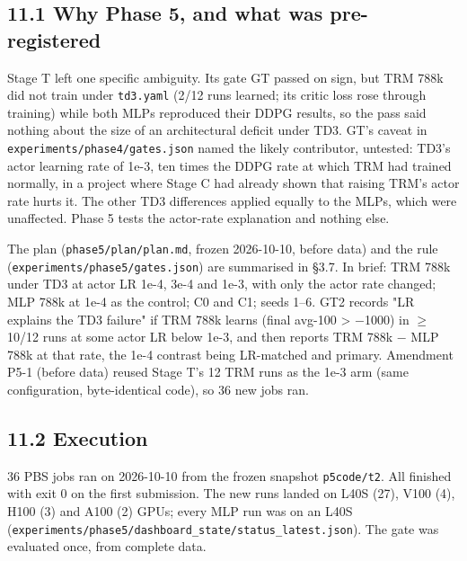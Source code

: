 \documentclass[11pt]{article}
\begin{document}
\subsection*{11.1 Why Phase 5, and what was pre-registered}



Stage T left one specific ambiguity. Its gate GT passed on sign, but TRM 788k did not train under \texttt{td3.yaml} (2/12 runs learned; its critic loss rose through training) while both MLPs reproduced their DDPG results, so the pass said nothing about the size of an architectural deficit under TD3. GT's caveat in \texttt{experiments/\allowbreak{}phase4/\allowbreak{}gates.\allowbreak{}json} named the likely contributor, untested: TD3's actor learning rate of 1e-3, ten times the DDPG rate at which TRM had trained normally, in a project where Stage C had already shown that raising TRM's actor rate hurts it. The other TD3 differences applied equally to the MLPs, which were unaffected. Phase 5 tests the actor-rate explanation and nothing else.



The plan (\texttt{phase5/\allowbreak{}plan/\allowbreak{}plan.\allowbreak{}md}, frozen 2026-10-10, before data) and the rule (\texttt{experiments/\allowbreak{}phase5/\allowbreak{}gates.\allowbreak{}json}) are summarised in \S{}3.7. In brief: TRM 788k under TD3 at actor LR 1e-4, 3e-4 and 1e-3, with only the actor rate changed; MLP 788k at 1e-4 as the control; C0 and C1; seeds 1--6. GT2 records "LR explains the TD3 failure" if TRM 788k learns (final avg-100 > $-$1000) in $\geq$ 10/12 runs at some actor LR below 1e-3, and then reports TRM 788k $-$ MLP 788k at that rate, the 1e-4 contrast being LR-matched and primary. Amendment P5-1 (before data) reused Stage T's 12 TRM runs as the 1e-3 arm (same configuration, byte-identical code), so 36 new jobs ran.



\subsection*{11.2 Execution}



36 PBS jobs ran on 2026-10-10 from the frozen snapshot \texttt{p5code/t2}. All finished with exit 0 on the first submission. The new runs landed on L40S (27), V100 (4), H100 (3) and A100 (2) GPUs; every MLP run was on an L40S (\texttt{experiments/\allowbreak{}phase5/\allowbreak{}dashboard\_\allowbreak{}state/\allowbreak{}status\_\allowbreak{}latest.\allowbreak{}json}). The gate was evaluated once, from complete data.
\end{document}
